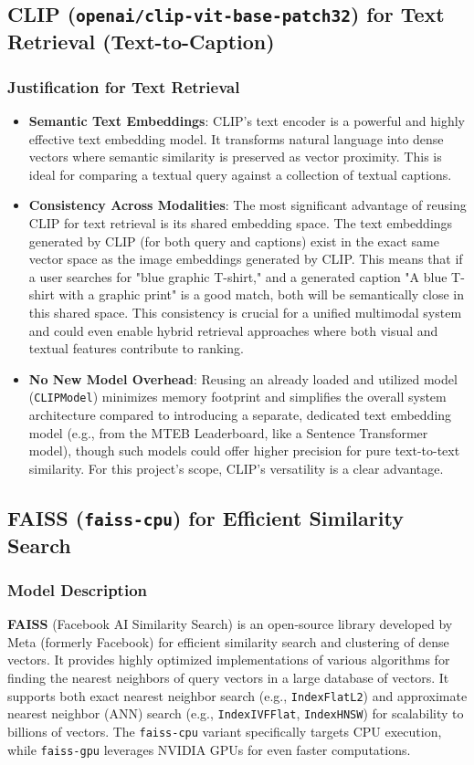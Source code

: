 \documentclass{article}
\begin{document}
\subsection{CLIP (\texttt{openai/clip-vit-base-patch32}) for Text Retrieval (Text-to-Caption)}
\subsubsection{Justification for Text Retrieval}
\begin{itemize}
    \item \textbf{Semantic Text Embeddings}: CLIP's text encoder is a powerful and highly effective text embedding model. It transforms natural language into dense vectors where semantic similarity is preserved as vector proximity. This is ideal for comparing a textual query against a collection of textual captions.
    \item \textbf{Consistency Across Modalities}: The most significant advantage of reusing CLIP for text retrieval is its shared embedding space. The text embeddings generated by CLIP (for both query and captions) exist in the exact same vector space as the image embeddings generated by CLIP. This means that if a user searches for "blue graphic T-shirt," and a generated caption "A blue T-shirt with a graphic print" is a good match, both will be semantically close in this shared space. This consistency is crucial for a unified multimodal system and could even enable hybrid retrieval approaches where both visual and textual features contribute to ranking.
    \item \textbf{No New Model Overhead}: Reusing an already loaded and utilized model (\texttt{CLIPModel}) minimizes memory footprint and simplifies the overall system architecture compared to introducing a separate, dedicated text embedding model (e.g., from the MTEB Leaderboard, like a Sentence Transformer model), though such models could offer higher precision for pure text-to-text similarity. For this project's scope, CLIP's versatility is a clear advantage.
\end{itemize}

\subsection{FAISS (\texttt{faiss-cpu}) for Efficient Similarity Search}
\subsubsection{Model Description}
\textbf{FAISS} (Facebook AI Similarity Search) is an open-source library developed by Meta (formerly Facebook) for efficient similarity search and clustering of dense vectors. It provides highly optimized implementations of various algorithms for finding the nearest neighbors of query vectors in a large database of vectors. It supports both exact nearest neighbor search (e.g., \texttt{IndexFlatL2}) and approximate nearest neighbor (ANN) search (e.g., \texttt{IndexIVFFlat}, \texttt{IndexHNSW}) for scalability to billions of vectors. The \texttt{faiss-cpu} variant specifically targets CPU execution, while \texttt{faiss-gpu} leverages NVIDIA GPUs for even faster computations.
\end{document}
